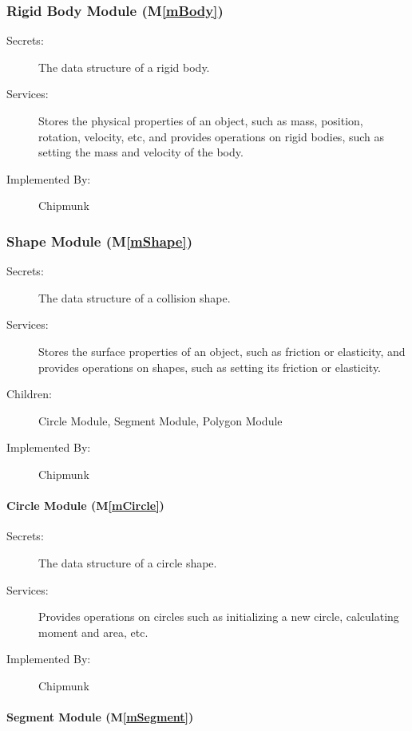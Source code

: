 \documentclass[12pt]{article}
\newcommand{\mref}[1]{M\ref{#1}}
\begin{document}
\subsubsection{Rigid Body Module (\mref{mBody})}

\begin{description}
\item[Secrets:]The data structure of a rigid body.
\item[Services:]Stores the physical properties of an object, such as mass, 
position, rotation, velocity, etc, and provides operations on rigid bodies, such as setting the mass and velocity of the body.

\item[Implemented By:] Chipmunk
\end{description}

\subsubsection{Shape Module (\mref{mShape})}

\begin{description}
\item[Secrets:]The data structure of a collision shape.
\item[Services:]Stores the surface properties of an object, such as friction or elasticity, and provides operations on shapes, such as setting its friction or elasticity.
\item[Children:] Circle Module, Segment Module, Polygon Module
\item[Implemented By:] Chipmunk
\end{description}

\paragraph{Circle Module (\mref{mCircle})}

\begin{description}
	\item[Secrets:] The data structure of a circle shape.
	\item[Services:] Provides operations on circles such as initializing a new circle, calculating moment and area, etc.
	\item[Implemented By:] Chipmunk
\end{description}

\paragraph{Segment Module (\mref{mSegment})}
\end{document}
